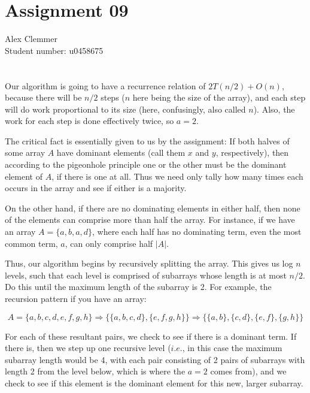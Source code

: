 \documentclass[a4paper]{article}
\begin{document}
\section*{Assignment 09}
Alex Clemmer\\
Student number: u0458675

\section{}

Our algorithm is going to have a recurrence relation of $2T(n/2) + O(n)$, because there will be $n/2$  steps ($n$ here being the size of the array), and each step will do work proportional to its size (here, confusingly, also called $n$). Also, the work for each step is done effectively twice, so $a = 2$.

The critical fact is essentially given to us by the assignment: If both halves of some array $A$ have dominant elements (call them $x$ and $y$, respectively), then according to the pigeonhole principle one or the other must be the dominant element of $A$, if there is one at all. Thus we need only tally how many times each occurs in the array and see if either is a majority.

On the other hand, if there are no dominating elements in either half, then none of the elements can comprise more than half the array. For instance, if we have an array $A = \{a, b, a, d\}$, where each half has no dominating term, even the most common term, $a$, can only comprise half $|A|$.

Thus, our algorithm begins by recursively splitting the array. This gives us log $n$ levels, such that each level is comprised of subarrays whose length is at most $n/2$. Do this until the maximum length of the subarray is 2. For example, the recursion pattern if you have an array:

\begin{equation*}
A = \{a, b, c, d, e, f, g, h\} \Rightarrow \{ \{a, b, c, d\}, \{e, f, g, h\} \} \Rightarrow \{ \{a, b\}, \{c, d\}, \{e, f\}, \{g, h\} \}
\end{equation*}

For each of these resultant pairs, we check to see if there is a dominant term. If there is, then we step up one recursive level ($\textit{i.e.}$, in this case the maximum subarray length would be 4, with each pair consisting of 2 pairs of subarrays with length 2 from the level below, which is where the $a = 2$ comes from), and we check to see if this element is the dominant element for this new, larger subarray.
\end{document}
